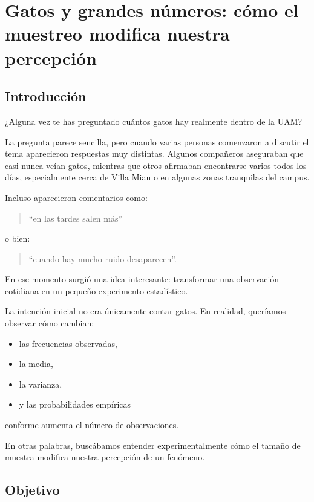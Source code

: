 
\section{Gatos y grandes números: cómo el muestreo modifica nuestra percepción}

\subsection{Introducción}

¿Alguna vez te has preguntado cuántos gatos hay realmente dentro de la UAM?

La pregunta parece sencilla, pero cuando varias personas comenzaron a discutir el tema aparecieron respuestas muy distintas. Algunos compañeros aseguraban que casi nunca veían gatos, mientras que otros afirmaban encontrarse varios todos los días, especialmente cerca de Villa Miau o en algunas zonas tranquilas del campus.

Incluso aparecieron comentarios como:

\begin{quote}
“en las tardes salen más”
\end{quote}

o bien:

\begin{quote}
“cuando hay mucho ruido desaparecen”.
\end{quote}

En ese momento surgió una idea interesante: transformar una observación cotidiana en un pequeño experimento estadístico.

La intención inicial no era únicamente contar gatos. En realidad, queríamos observar cómo cambian:

\begin{itemize}
\item las frecuencias observadas,
\item la media,
\item la varianza,
\item y las probabilidades empíricas
\end{itemize}

conforme aumenta el número de observaciones.

En otras palabras, buscábamos entender experimentalmente cómo el tamaño de muestra modifica nuestra percepción de un fenómeno.

\subsection{Objetivo}

